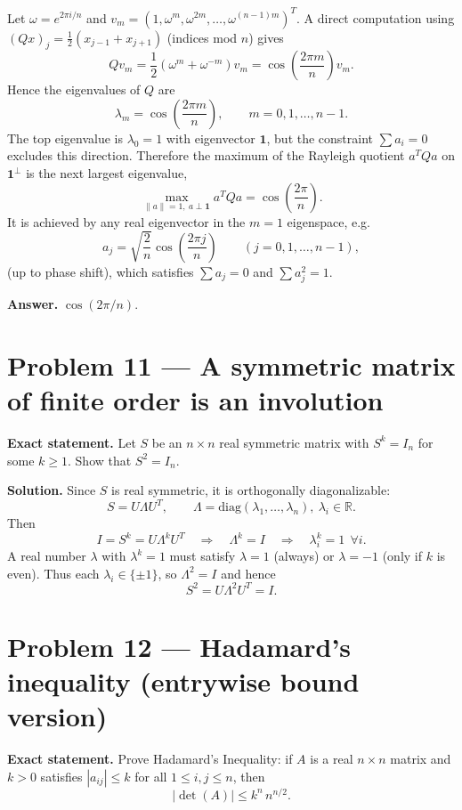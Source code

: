 \documentclass[12pt,a4paper]{article}
\theoremstyle{plain}
\theoremstyle{definition}      %
\begin{document}
Let $\omega=e^{2\pi i/n}$ and $v_m=(1,\omega^m,\omega^{2m},\dots,\omega^{(n-1)m})^T$.
A direct computation using $(Qx)_j=\tfrac12(x_{j-1}+x_{j+1})$ (indices mod $n$) gives
\[
Qv_m=\frac12(\omega^m+\omega^{-m})v_m=\cos\!\left(\frac{2\pi m}{n}\right)v_m.
\]
Hence the eigenvalues of $Q$ are
\[
\lambda_m=\cos\!\left(\frac{2\pi m}{n}\right),\qquad m=0,1,\dots,n-1.
\]
The top eigenvalue is $\lambda_0=1$ with eigenvector $\mathbf 1$, but the constraint $\sum a_i=0$ excludes this direction.
Therefore the maximum of the Rayleigh quotient $a^TQa$ on $\mathbf 1^\perp$ is the next largest eigenvalue,
\[
\max_{\|a\|=1,\ a\perp \mathbf 1} a^TQa=\cos\!\left(\frac{2\pi}{n}\right).
\]
It is achieved by any real eigenvector in the $m=1$ eigenspace, e.g.
\[
a_j=\sqrt{\frac{2}{n}}\cos\!\left(\frac{2\pi j}{n}\right)\qquad (j=0,1,\dots,n-1),
\]
(up to phase shift), which satisfies $\sum a_j=0$ and $\sum a_j^2=1$.

\medskip
\noindent
\textbf{Answer.} $\boxed{\cos(2\pi/n)}$.


\section{Problem 11 — A symmetric matrix of finite order is an involution}

\textbf{Exact statement.}
Let $S$ be an $n\times n$ real symmetric matrix with $S^k=I_n$ for some $k\ge 1$.
Show that $S^2=I_n$.

\textbf{Solution.}
Since $S$ is real symmetric, it is orthogonally diagonalizable:
\[
S=U\Lambda U^T,\qquad \Lambda=\mathrm{diag}(\lambda_1,\dots,\lambda_n),\ \lambda_i\in\mathbb R.
\]
Then
\[
I=S^k=U\Lambda^kU^T \quad\Rightarrow\quad \Lambda^k=I \quad\Rightarrow\quad \lambda_i^k=1\ \ \forall i.
\]
A real number $\lambda$ with $\lambda^k=1$ must satisfy $\lambda=1$ (always) or $\lambda=-1$ (only if $k$ is even).
Thus each $\lambda_i\in\{\pm 1\}$, so $\Lambda^2=I$ and hence
\[
S^2=U\Lambda^2U^T=I.
\]


\section{Problem 12 — Hadamard's inequality (entrywise bound version)}

\textbf{Exact statement.}
Prove Hadamard's Inequality: if $A$ is a real $n\times n$ matrix and $k>0$ satisfies $|a_{ij}|\le k$ for all $1\le i,j\le n$, then
\[
|\det(A)|\le k^n\,n^{n/2}.
\]
\end{document}
